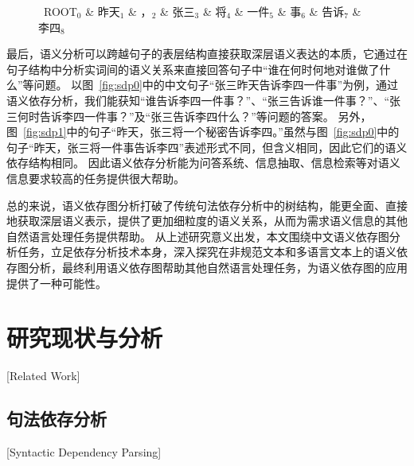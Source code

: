 \begin{figure}[htb]
	\begin{center}
			\begin{dependency}[arc edge, arc angle=80, text only label, label style={above}]
				\begin{deptext} [row sep=0.4cm, column sep=.1cm]
					\ ROOT$_0$ \& 昨天$_1$ \& ，$_2$ \& 张三$_3$ \&  将$_4$  \& 一件$_5$ \& 事$_6$ \& 告诉$_7$ \& 李四$_8$  \\
				\end{deptext}
			\end{dependency}
	\end{center}
\end{figure}


最后，语义分析可以跨越句子的表层结构直接获取深层语义表达的本质，它通过在句子结构中分析实词间的语义关系来直接回答句子中“谁在何时何地对谁做了什么”等问题。
以图~\ref{fig:sdp0}中的中文句子“张三昨天告诉李四一件事”为例，通过语义依存分析，我们能获知“谁告诉李四一件事？”、“张三告诉谁一件事？”、“张三何时告诉李四一件事？”及“张三告诉李四什么？”等问题的答案。
另外，图~\ref{fig:sdp1}中的句子“昨天，张三将一个秘密告诉李四。”虽然与图~\ref{fig:sdp0}中的句子“昨天，张三将一件事告诉李四”表述形式不同，但含义相同，因此它们的语义依存结构相同。
因此语义依存分析能为问答系统、信息抽取、信息检索等对语义信息要求较高的任务提供很大帮助。

总的来说，语义依存图分析打破了传统句法依存分析中的树结构，能更全面、直接地获取深层语义表示，提供了更加细粒度的语义关系，从而为需求语义信息的其他自然语言处理任务提供帮助。
从上述研究意义出发，本文围绕中文语义依存图分析任务，立足依存分析技术本身，深入探究在非规范文本和多语言文本上的语义依存图分析，最终利用语义依存图帮助其他自然语言处理任务，为语义依存图的应用提供了一种可能性。

\section{研究现状与分析}[Related Work]

\subsection{句法依存分析}[Syntactic Dependency Parsing]

